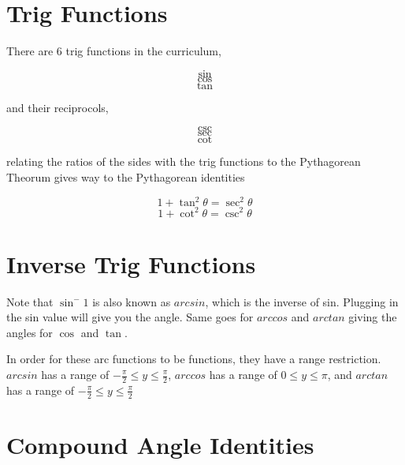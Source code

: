 \documentclass[../main.tex]{subfiles}
\begin{document}
\section{Trig Functions}

There are 6 trig functions in the curriculum,

\[ \sin \]
\[ \cos \]
\[ \tan \]

and their reciprocols,

\[ \csc \]
\[ \sec \]
\[ \cot \]

relating the ratios of the sides with the trig functions to the Pythagorean Theorum gives way to the Pythagorean identities

\[ 1 + \tan^2 \theta  = \sec^2 \theta \]
\[ 1 + \cot^2 \theta = \csc^2 \theta \]

\section{Inverse Trig Functions}

Note that $\sin^-1$ is also known as $arcsin$, which is the inverse of sin. Plugging in the sin value will give you the angle. Same goes for $arccos$ and $arctan$ giving the angles for $\cos$ and $\tan$. 

In order for these arc functions to be functions, they have a range restriction. $arcsin$ has a range of $-\frac{\pi}{2} \leq y \leq \frac{\pi}{2}$, $arccos$ has a range of $0 \leq y \leq \pi$, and $arctan$ has a range of $-\frac{\pi}{2} \leq y \leq \frac{\pi}{2}$ 

\section{Compound Angle Identities}
\end{document}
